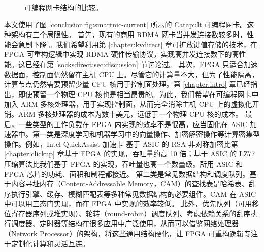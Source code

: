 \begin{figure}[htbp]
	\centering
	\hspace{0.05\textwidth}
	\caption{可编程网卡结构的比较。}
\end{figure}

本文使用了图 \ref{conclusion:fig:smartnic-current} 所示的 Catapult 可编程网卡。这种架构有三个局限性。
首先，现有的商用 RDMA 网卡当并发连接数较多时，性能会急剧下降 \cite{mprdma}。我们希望利用第 \ref{chapter:kvdirect} 章可扩放键值存储的技术，在 FPGA 可重构逻辑中实现 RDMA 硬件传输协议，实现高并发连接数下的高性能。这已经在第 \ref{socksdirect:sec:discussion} 节讨论过。
其次，FPGA 只适合加速数据面，控制面仍然留在主机 CPU 上。尽管它的计算量不大，但为了性能隔离，计算节点仍然需要预留少量 CPU 核用于控制面处理。第 \ref{chapter:intro} 章已经指出，即使预留一个物理 CPU 核也是相当昂贵的。为此，我们希望在可编程网卡中加入 ARM 多核处理器，用于实现控制面，从而完全消除主机 CPU 上的虚拟化开销。ARM 多核处理器的成本为数十美元，远低于一个物理 CPU 核的成本。
最后，一些类型的工作负载在 FPGA 内实现的效率不是很高，应当固化在 ASIC 加速器中。第一类是深度学习和机器学习中的向量操作、加密解密操作等计算密集型操作。例如，Intel QuickAssist 加速卡 \cite{intel-qat} 基于 ASIC 的 RSA 非对称加密比第 \ref{chapter:clicknp} 章基于 FPGA 的实现，吞吐量约高 10 倍；基于 ASIC 的 LZ77 压缩算法比我们基于 FPGA 的实现，吞吐量也高一个数量级。所用 ASIC 和 FPGA 芯片的功耗、面积和制程都接近。
第二类是常见数据结构和调度队列。基于内容寻址内存（Content-Addressable Memory，CAM）的查找表是哈希表、乱序执行引擎、缓存、模糊匹配表等多种常见数据结构的必要组件。CAM 在 ASIC 中可以用三态门实现，而在 FPGA 中实现的效率较低。
此外，优先队列（可用移位寄存器序列或堆实现）、轮转（round-robin）调度队列、考虑依赖关系的乱序执行调度器、定时器等结构在很多应用中广泛使用，从而可以借鉴网络处理器（Network Processor）的架构，将这些通用结构硬化，让 FPGA 可重构逻辑专注于定制化计算和灵活互连。

